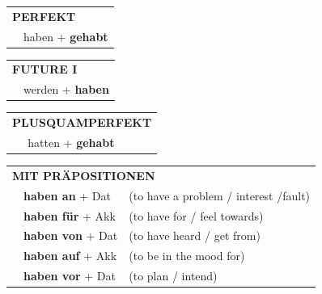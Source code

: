 \documentclass[10pt,a4paper]{revtex4-2}
\begin{document}
\begin{verbbox-acc}
    \vspace{10pt}
 
    \begin{tabular}{rl}
     \multicolumn{2}{l}{\textbf{PERFEKT}}\\
    &haben + \textbf{gehabt}\\
  \end{tabular}
\hfill
   \begin{tabular}{rl}
   
    \multicolumn{2}{l}{\textbf{FUTURE I} }\\
    &werden + \textbf{haben}\\
 
  \end{tabular}
\hfill
   \begin{tabular}{rl}
      \multicolumn{2}{l}{\textbf{PLUSQUAMPERFEKT}}\\
    &hatten + \textbf{gehabt}\\
  \end{tabular}
  


  \vspace{10pt}

   \begin{tabular}{lll}
      \multicolumn{3}{l}{\textbf{MIT PRÄPOSITIONEN}}\\
& \textbf{haben an} + Dat & (to have a problem / interest /fault)\\
& \textbf{haben für} + Akk & (to have for / feel towards)\\
&\textbf{haben von} + Dat & (to have heard / get from)\\
&\textbf{haben auf} + Akk & (to be in the mood for)\\
&\textbf{haben vor} + Dat & (to plan / intend)
  \end{tabular}




  \vspace{-5pt}


\end{verbbox-acc}
\end{document}
